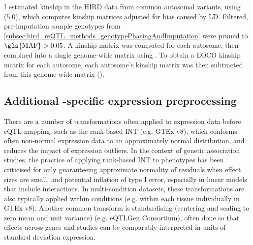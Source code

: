 I estimated kinship in the \gls{HIRD} data from common autosomal variants, using  (5.0), which computes kinship matrices adjusted for bias caused by \gls{LD}\autocite{speed2012ImprovedHeritabilityEstimation}.
Filtered, pre-imputation sample genotypes from \autoref{subsec:hird_reQTL_methods_genotypePhasingAndImputation} were pruned to $\text{\gls{MAF}} > 0.05$.
A kinship matrix was computed for each autosome, then combined into a single genome-wide matrix using .
To obtain a \gls{LOCO} kinship matrix for each autosome, each autosome's kinship matrix was then subtracted from this genome-wide matrix ().


\subsection{Additional -specific expression preprocessing}

There are a number of transformations often applied to expression data before \gls{eQTL} mapping, 
such as the rank-based \gls{INT} (e.g. GTEx v8\autocite{aguet2019GTExConsortiumAtlas}),
which conforms often non-normal expression data to an approximately normal distribution, and reduces the impact of expression outliers.
In the context of genetic association studies, the practice of applying rank-based \gls{INT} to phenotypes has been criticised for only guaranteeing approximate normality of residuals when effect sizes are small,
and potential inflation of type I error, especially in linear models that include interactions\autocite{beasley2009RankBasedInverseNormal}.
In multi-condition datasets, these transformations are also typically applied within conditions (e.g. within each tissue individually in GTEx v8\autocite{aguet2019GTExConsortiumAtlas}).
Another common transform is standardising (centering and scaling to zero mean and unit variance) (e.g. eQTLGen Consortium\autocite{vosa2018UnravelingPolygenicArchitecture}),
often done so that effects across genes and studies can be comparably interpreted in units of standard deviation expression\autocite{qi2018IdentifyingGeneTargets}.

